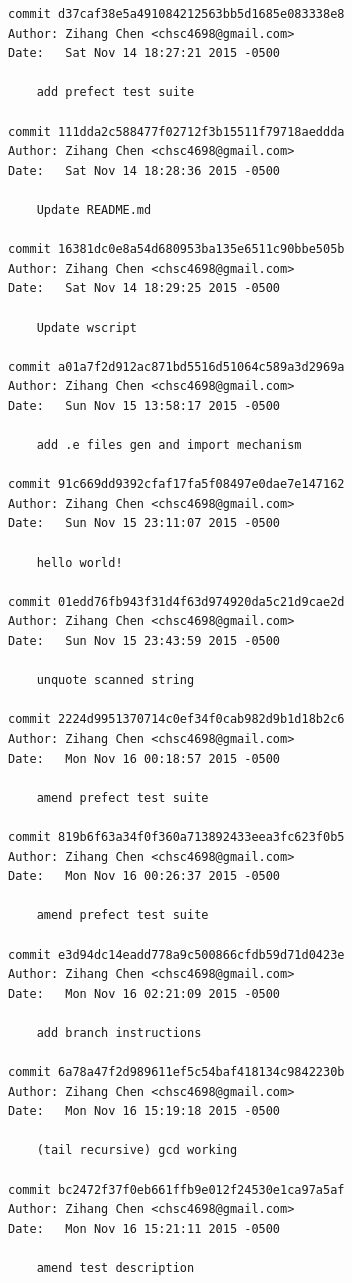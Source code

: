 \documentclass{report}
\begin{document}
\begin{appendices}
\begin{verbatim}
commit d37caf38e5a491084212563bb5d1685e083338e8
Author: Zihang Chen <chsc4698@gmail.com>
Date:   Sat Nov 14 18:27:21 2015 -0500

    add prefect test suite

commit 111dda2c588477f02712f3b15511f79718aeddda
Author: Zihang Chen <chsc4698@gmail.com>
Date:   Sat Nov 14 18:28:36 2015 -0500

    Update README.md

commit 16381dc0e8a54d680953ba135e6511c90bbe505b
Author: Zihang Chen <chsc4698@gmail.com>
Date:   Sat Nov 14 18:29:25 2015 -0500

    Update wscript

commit a01a7f2d912ac871bd5516d51064c589a3d2969a
Author: Zihang Chen <chsc4698@gmail.com>
Date:   Sun Nov 15 13:58:17 2015 -0500

    add .e files gen and import mechanism

commit 91c669dd9392cfaf17fa5f08497e0dae7e147162
Author: Zihang Chen <chsc4698@gmail.com>
Date:   Sun Nov 15 23:11:07 2015 -0500

    hello world!

commit 01edd76fb943f31d4f63d974920da5c21d9cae2d
Author: Zihang Chen <chsc4698@gmail.com>
Date:   Sun Nov 15 23:43:59 2015 -0500

    unquote scanned string

commit 2224d9951370714c0ef34f0cab982d9b1d18b2c6
Author: Zihang Chen <chsc4698@gmail.com>
Date:   Mon Nov 16 00:18:57 2015 -0500

    amend prefect test suite

commit 819b6f63a34f0f360a713892433eea3fc623f0b5
Author: Zihang Chen <chsc4698@gmail.com>
Date:   Mon Nov 16 00:26:37 2015 -0500

    amend prefect test suite

commit e3d94dc14eadd778a9c500866cfdb59d71d0423e
Author: Zihang Chen <chsc4698@gmail.com>
Date:   Mon Nov 16 02:21:09 2015 -0500

    add branch instructions

commit 6a78a47f2d989611ef5c54baf418134c9842230b
Author: Zihang Chen <chsc4698@gmail.com>
Date:   Mon Nov 16 15:19:18 2015 -0500

    (tail recursive) gcd working

commit bc2472f37f0eb661ffb9e012f24530e1ca97a5af
Author: Zihang Chen <chsc4698@gmail.com>
Date:   Mon Nov 16 15:21:11 2015 -0500

    amend test description


\end{verbatim}
\end{appendices}
\end{document}
